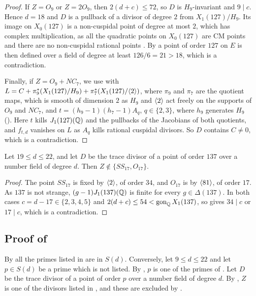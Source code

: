 \begin{proof}
If $Z=O_9$ or $Z=2O_9$, then $2(d+c)\leq 72$, so $D$ is $H_9$-invariant and $9\mid c$. Hence $d=18$ and $D$ is a pullback of a divisor of degree $2$ from $X_1(127)/H_9$. Its image on $X_0(127)$ is a non-cuspidal point of degree at most $2$, which has complex multiplication, as all the quadratic points on $X_0(127)$ are CM points \cite[Table 16]{AKMNOV} and there are no non-cuspidal rational points \cite[Theorem 1]{mazur78}. By  a point of order $127$ on $E$ is then defined over a field of degree at least $126/6=21>18$, which is a contradiction.

Finally, if $Z=O_9+NC_7$, we use  with $L=C+\pi_9^*(X_1(127)/H_9)+\pi_7^*(X_1(127)/\langle 2\rangle)$, where $\pi_9$ and $\pi_7$ are the quotient maps, which is smooth of dimension $2$ as $H_9$ and $\langle 2\rangle$ act freely on the supports of $O_9$ and $NC_7$, and $t=(h_9-1)(h_7-1)A_q$, $q\in\{2,3\}$, where $h_9$ generates $H_9$ (). Here $t$ kills $J_1(127)(\mathbb{Q})$ and the pullbacks of the Jacobians of both quotients, and $f_{t,d}$ vanishes on $L$ as $A_q$ kills rational cuspidal divisors. So $D$ contains $C\neq0$, which is a contradiction.
\end{proof}

\begin{proposition}\label{prop:137}
Let $19\leq d\leq 22$, and let $D$ be the trace divisor of a point of order $137$ over a number field of degree $d$. Then $Z\notin\{SS_{17},O_{17}\}$.
\end{proposition}

\begin{proof}
The point $SS_{17}$ is fixed by $\langle 2\rangle$, of order $34$, and $O_{17}$ is  by $\langle 81\rangle$, of order $17$. As $137$ is not strange, $(g-1)J_1(137)(\mathbb{Q})$ is finite for every $g\in\Delta(137)$. In both cases $c=d-17\in\{2,3,4,5\}$ and $2(d+c)\leq 54<\operatorname{gon}_{\mathbb{Q}} X_1(137)$, so  gives $34\mid c$ or $17\mid c$, which is a contradiction.
\end{proof}

\subsection{Proof of \texorpdfstring{}{Theorem 1.1}}
By  all the primes listed in  are in $S(d)$. Conversely, let $9\leq d\leq 22$ and let $p\in S(d)$ be a prime which is not listed. By , $p$ is one of the primes of . Let $D$ be the trace divisor of a point of order $p$ over a number field of degree $d$. By , $Z$ is one of the divisors listed in , and these are excluded by .
